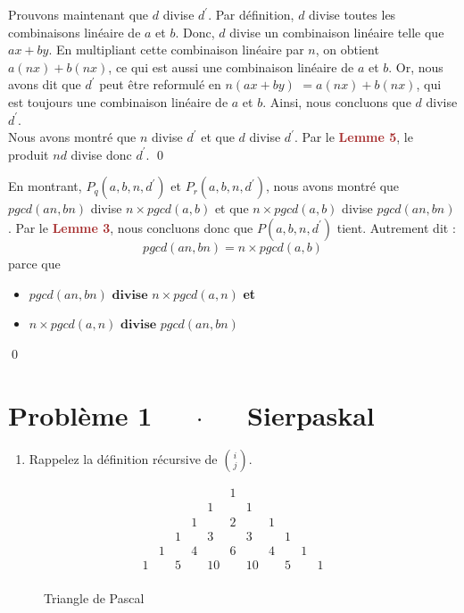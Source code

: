 \documentclass[16pt]{report}
\begin{document}
\begin{multicols*}{2}
\begin{Preuve*}{}{}
        Prouvons maintenant que $d$ divise $d^{\prime}$. Par définition, $d$ divise 
        toutes les combinaisons linéaire de $a$ et $b$. Donc, $d$  divise un combinaison linéaire telle que 
        $ax + by$. En multipliant cette combinaison linéaire par $n$, on obtient $a(nx) + b(nx)$, ce qui est 
        aussi une combinaison linéaire de $a$ et $b$. Or, nous avons dit que $d^{\prime}$ peut être 
        reformulé en \textcolor{myp}{$n(ax + by)$} $ = a(nx) + b(nx)$, qui est toujours 
        une combinaison linéaire de $a$ et $b$. Ainsi, nous concluons que $d$ divise $d^{\prime}$. \vspace{1em} \\ 
        Nous avons montré que $n$ divise $d^{\prime}$ et que $d$ divise $d^{\prime}$. 
        Par le \textbf{\textcolor{brown}{Lemme 5}}, le produit $nd$ divise donc $d^{\prime}$. \qed   
    \end{Preuve*}


    En montrant, $P_q(a,b, n, d^{\prime})$ et $P_r(a,b, n, d^{\prime})$, nous avons montré que 
    $pgcd(an, bn)$ divise $n\times pgcd(a,b)$ et que $n \times pgcd(a, b)$ divise $pgcd(an, bn)$. 
    Par le \textbf{\textcolor{brown}{Lemme 3}}, nous concluons donc que $P(a,b,n, d^{\prime})$ tient. 
    Autrement dit : 
    \[ pgcd(an, bn) =  n \times pgcd(a, b) \]
    parce que 
    \begin{itemize}
        \item $pgcd(an, bn) \textbf{ divise }  n\times pgcd(a,n)$ \textbf{et} \\ 
        \item $n\times pgcd(a,n) \textbf{ divise } pgcd(an, bn)$
    \end{itemize}
    \qed

    \section*{Problème 1 $\quad$ $\cdot$  $\quad$ Sierpaskal}
    

    \begin{enumerate}
        \item Rappelez la définition récursive de $i \choose j$.  
    \end{enumerate}

    \begin{figure}[H]
                \[
                \begin{array}{ccccccccccccc}
                 & & & & & 1 & & & & & \\
                 & & & & 1 & & 1 & & & & \\
                 & & & 1 & & 2 & & 1 & & & \\
                 & & 1 & & 3 & & 3 & & 1 & & \\
                 & 1 & & 4 & & 6 & & 4 & & 1 & \\
                1 & & 5 & & 10 & & 10 & & 5 & & 1 \\
                \end{array}
                \]
    \caption{Triangle de Pascal }
    \end{figure}


\end{multicols*}
\end{document}
